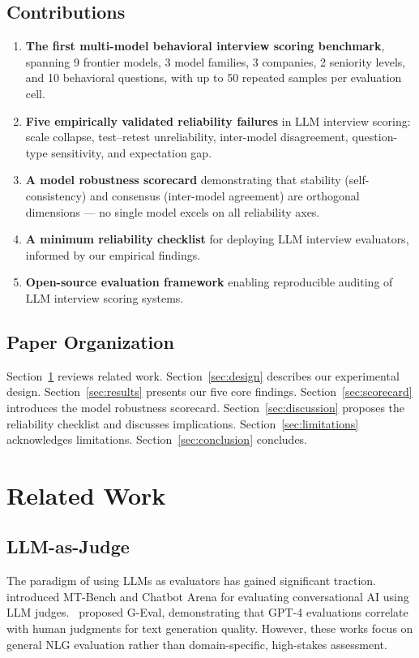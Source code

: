 \documentclass{article}
\begin{document}
\subsection{Contributions}
\begin{enumerate}
  \item \textbf{The first multi-model behavioral interview scoring benchmark}, spanning 9 frontier models, 3 model families, 3 companies, 2 seniority levels, and 10 behavioral questions, with up to 50 repeated samples per evaluation cell.
  \item \textbf{Five empirically validated reliability failures} in LLM interview scoring: scale collapse, test--retest unreliability, inter-model disagreement, question-type sensitivity, and expectation gap.
  \item \textbf{A model robustness scorecard} demonstrating that stability (self-consistency) and consensus (inter-model agreement) are orthogonal dimensions --- no single model excels on all reliability axes.
  \item \textbf{A minimum reliability checklist} for deploying LLM interview evaluators, informed by our empirical findings.
  \item \textbf{Open-source evaluation framework} enabling reproducible auditing of LLM interview scoring systems.
\end{enumerate}

\subsection{Paper Organization}
Section~\ref{sec:related} reviews related work. Section~\ref{sec:design} describes our experimental design. Section~\ref{sec:results} presents our five core findings. Section~\ref{sec:scorecard} introduces the model robustness scorecard. Section~\ref{sec:discussion} proposes the reliability checklist and discusses implications. Section~\ref{sec:limitations} acknowledges limitations. Section~\ref{sec:conclusion} concludes.

\section{Related Work}\label{sec:related}

\subsection{LLM-as-Judge}
The paradigm of using LLMs as evaluators has gained significant traction.~\cite{zheng2023} introduced MT-Bench and Chatbot Arena for evaluating conversational AI using LLM judges.~\cite{liu2023geval} proposed G-Eval, demonstrating that GPT-4 evaluations correlate with human judgments for text generation quality. However, these works focus on general NLG evaluation rather than domain-specific, high-stakes assessment.
\end{document}
